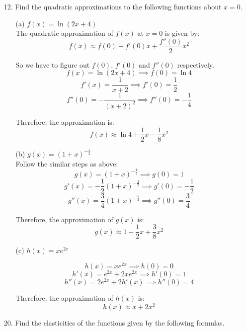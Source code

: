\documentclass{article}
\begin{document}
\begin{enumerate}
\begin{enumerate}
        \end{enumerate}
        
    \item[12.] Find the quadratic approximations to the following functions about $x = 0$.
    
        \begin{enumerate}
            \item[(a)] $ f(x) = \ln{(2x + 4)} $ \\
            
            The quadratic approximation of $f(x)$ at $x=0$ is given by:
            $$ f(x) \approx f(0) + f'(0)x + \frac{f''(0)}{2}x^2 $$
            
            So we have to figure out $f(0)$, $f'(0)$ and $f''(0)$ respectively.
            $$ f(x) = \ln{(2x + 4)} \implies f(0) = \ln{4} $$
            $$ f'(x) = \frac{1}{x+2} \implies f'(0) = \frac{1}{2} $$
            $$ f''(0) = -\frac{1}{(x+2)^2} \implies f''(0) = -\frac{1}{4} $$
           
            Therefore, the approximation is:
            $$ f(x) \approx \ln{4} + \frac{1}{2}x - \frac{1}{8}x^2 $$
            
            \item[(b)] $ g(x) = (1 + x)^{-\frac{1}{2}} $ \\
            
            Follow the similar steps as above:
            $$ g(x) = (1+x)^{-\frac{1}{2}} \implies g(0) = 1 $$
            $$ g'(x) = -\frac{1}{2}(1+x)^{-\frac{3}{2}} \implies g'(0) = -\frac{1}{2} $$
            $$ g''(x) = \frac{3}{4}(1+x)^{-\frac{5}{2}} \implies g''(0) = \frac{3}{4} $$
            
            Therefore, the approximation of $g(x)$ is:
            $$ g(x) \approx 1 - \frac{1}{2}x + \frac{3}{8}x^2 $$
            
            \item[(c)] $ h(x) = xe^{2x} $
            
            $$ h(x) = xe^{2x} \implies h(0) = 0 $$
            $$ h'(x) = e^{2x} + 2xe^{2x} \implies h'(0) = 1 $$
            $$ h''(x) = 2e^{2x} + 2h'(x) \implies h''(0) = 4 $$
            
            Therefore, the approximation of $h(x)$ is:
            $$ h(x) \approx x + 2x^2 $$
            
        \end{enumerate}
    
    \item[20.] Find the elasticities of the functions given by the following formulas.
    

\end{enumerate}
\end{document}
